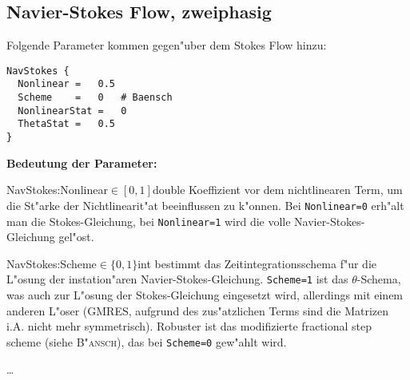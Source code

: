 \subsection{Navier-Stokes Flow, zweiphasig}
Folgende Parameter kommen gegen"uber dem Stokes Flow hinzu:
\begin{Code}
\begin{verbatim}
NavStokes {
  Nonlinear	=	0.5
  Scheme	=	0	# Baensch
  NonlinearStat	=	0
  ThetaStat	=	0.5
}
\end{verbatim}
\end{Code}

{\bf Bedeutung der Parameter: }

\begin{Desc}
{NavStokes:Nonlinear}{$\in[0,1]$}{double}
Koeffizient vor dem nichtlinearen Term, um die St"arke der Nichtlinearit"at
beeinflussen zu k"onnen. Bei \verb|Nonlinear=0| erh"alt man die
Stokes-Gleichung, bei \verb|Nonlinear=1| wird die volle
Navier-Stokes-Gleichung gel"ost.
\end{Desc}
%
\begin{Desc}
{NavStokes:Scheme}{$\in\{0,1\}$}{int}
bestimmt das Zeitintegrationsschema f"ur die L"osung der instation"aren
Navier-Stokes-Gleichung. \verb|Scheme=1| ist das $\theta$-Schema, was auch zur
L"osung der Stokes-Gleichung eingesetzt wird, allerdings mit einem anderen
L"oser (GMRES, aufgrund des zus"atzlichen Terms sind die Matrizen i.A. nicht mehr
symmetrisch). Robuster ist das modifizierte fractional step scheme (siehe
\textsc{B"ansch}), das bei \verb|Scheme=0| gew"ahlt wird.
\end{Desc}
%

\ldots

